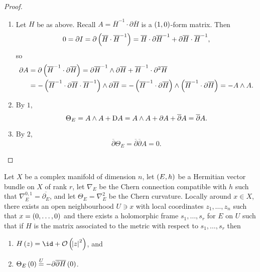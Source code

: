 \begin{proof}
\hfill
\begin{enumerate}
\item Let $ H $ be as above. Recall $ A = \overline{H}^{-1} \cdot \partial\overline{H} $ is a $ \br{1, 0} $-form matrix. Then
$$ 0 = \partial I = \partial\br{\overline{H} \cdot \overline{H}^{-1}} = \overline{H} \cdot \partial\overline{H}^{-1} + \partial\overline{H} \cdot \overline{H}^{-1}, $$
so
\begin{align*}
\partial A
& = \partial\br{\overline{H}^{-1} \cdot \partial\overline{H}}
= \partial\overline{H}^{-1} \wedge \partial\overline{H} + \overline{H}^{-1} \cdot \partial^2\overline{H} \\
& = -\br{\overline{H}^{-1} \cdot \partial\overline{H} \cdot \overline{H}^{-1}} \wedge \partial\overline{H}
= -\br{\overline{H}^{-1} \cdot \partial\overline{H}} \wedge \br{\overline{H}^{-1} \cdot \partial\overline{H}}
= -A \wedge A.
\end{align*}
\item By $ 1 $,
$$ \Theta_E = A \wedge A + \mathrm{D} A = A \wedge A + \partial A + \overline{\partial}A = \overline{\partial}A. $$
\item By $ 2 $,
$$ \overline{\partial}\Theta_E = \overline{\partial}\overline{\partial}A = 0. $$
\end{enumerate}
\end{proof}

\pagebreak

\begin{lemma}
Let $ X $ be a complex manifold of dimension $ n $, let $ \br{E, h} $ be a Hermitian vector bundle on $ X $ of rank $ r $, let $ \nabla_E $ be the Chern connection compatible with $ h $ such that $ \nabla_E^{0, 1} = \overline{\partial_E} $, and let $ \Theta_E = \nabla_E^2 $ be the Chern curvature. Locally around $ x \in X $, there exists an open neighbourhood $ U \ni x $ with local coordinates $ z_1, \dots, z_n $ such that $ x = \br{0, \dots, 0} $ and there exists a holomorphic frame $ s_1, \dots, s_r $ for $ E $ on $ U $ such that if $ H $ is the matrix associated to the metric with respect to $ s_1, \dots, s_r $ then
\begin{enumerate}
\item $ H\br{z} = \id + \OOO\br{\abs{z}^2} $, and
\item $ \Theta_E\br{0} \overset{U}{=} -\partial\overline{\partial}\overline{H}\br{0} $.
\end{enumerate}
\end{lemma}

